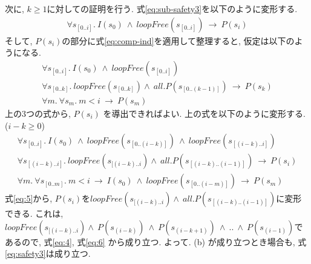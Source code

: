 \documentclass{jsarticle}
\begin{document}
次に, $k \geq 1$に対しての証明を行う.
式\eqref{eq:sub-safety3}を以下のように変形する.
\begin{align}
 \label{eq:sub-safety4}
  \forall s_{[0..i]}. \ I(s_0) \ \wedge \ \mathit{loopFree}(s_{[0..i]}) \ \to \ P(s_i)
\end{align}
そして, $P(s_i)$の部分に式\eqref{eq:comp-ind}を適用して整理すると, 仮定は以下のようになる.
\begin{align}
  \forall s_{[0..i]}. \ I(s_0) \ \wedge \ \mathit{loopFree}(s_{[0..i]}) \label{eq:1}\\
  \forall s_{[0..k]}. \ \mathit{loopFree}(s_{[0..k]}) \land \ \mathit{all.} P(s_{[0..(k-1)]}) \ \to \ P(s_k) \label{eq:2} \\
  \forall m. \ \forall s_m. \ m < i \ \to \ P(s_m) \label{eq:3}
\end{align}
上の3つの式から, $P(s_i)$ を導出できればよい.
上の式を以下のように変形する. ($i - k \geq 0$) 
\begin{align}
  \forall s_{[0..i]}. \ I(s_0) \ \land \ \mathit{loopFree}(s_{[0..(i-k)]}) \ \land \ \mathit{loopFree}(s_{[(i-k)..i]}) \label{eq:4}\\
  \forall s_{[(i-k)..i]}. \ \mathit{loopFree}(s_{[(i-k)..i}) \land \ \mathit{all.} P(s_{[(i-k)..(i-1)]}) \ \to \ P(s_i) \label{eq:5} \\
  \forall m. \ \forall s_{[0..m]}. \ m < i \ \to \ I(s_0) \ \land \ \mathit{loopFree}(s_{[0..(i-m)]}) \ \to \ P(s_m) \label{eq:6}
\end{align}
式\eqref{eq:5}から, $P(s_i)$を$\mathit{loopFree}(s_{[(i-k)..i}) \land \ \mathit{all.} P(s_{[(i-k)..(i-1)]})$に変形できる.
これは, $\mathit{loopFree}(s_{[(i-k)..i}) \land \ P(s_{(i-k)}) \ \land \ P(s_{(i-k+1)}) \ \land \ .. \ \land \ P(s_{(i-1)})$であるので, 式\eqref{eq:4}, 式\eqref{eq:6} から成り立つ.
よって. (b) が成り立つとき場合も, 式\eqref{eq:safety3}は成り立つ.
\end{document}

